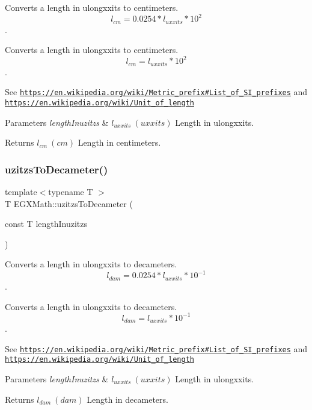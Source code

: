 Converts a length in ulongxxits to centimeters. \[ l_{cm}=0.0254 * l_{uxxits} * 10^{2} \]. 

Converts a length in ulongxxits to centimeters. \[ l_{cm}=l_{uxxits} * 10^{2} \].

See \href{https://en.wikipedia.org/wiki/Metric_prefix#List_of_SI_prefixes}{\tt https\+://en.\+wikipedia.\+org/wiki/\+Metric\+\_\+prefix\#\+List\+\_\+of\+\_\+\+S\+I\+\_\+prefixes} and \href{https://en.wikipedia.org/wiki/Unit_of_length}{\tt https\+://en.\+wikipedia.\+org/wiki/\+Unit\+\_\+of\+\_\+length} 
\begin{DoxyParams}{Parameters}
{\em length\+Inuzitzs} & $ l_{uxxits}\ (uxxits)$ Length in ulongxxits. \\
\hline
\end{DoxyParams}
\begin{DoxyReturn}{Returns}
$ l_{cm}\ (cm)$ Length in centimeters. 
\end{DoxyReturn}
\mbox{\label{group___e_g_x_math-_conversions-_length_conversions-_imperial-uzitzs-_s_i_ga62dcf7a675d92ce74d56e67f2fed7ace}} 
\subsubsection{\texorpdfstring{uzitzs\+To\+Decameter()}{uzitzsToDecameter()}}
{\footnotesize\ttfamily template$<$typename T $>$ \\
T E\+G\+X\+Math\+::uzitzs\+To\+Decameter (\begin{DoxyParamCaption}\item[{const T}]{length\+Inuzitzs }\end{DoxyParamCaption})}



Converts a length in ulongxxits to decameters. \[ l_{dam}=0.0254 * l_{uxxits} * 10^{-1} \]. 

Converts a length in ulongxxits to decameters. \[ l_{dam}=l_{uxxits} * 10^{-1} \].

See \href{https://en.wikipedia.org/wiki/Metric_prefix#List_of_SI_prefixes}{\tt https\+://en.\+wikipedia.\+org/wiki/\+Metric\+\_\+prefix\#\+List\+\_\+of\+\_\+\+S\+I\+\_\+prefixes} and \href{https://en.wikipedia.org/wiki/Unit_of_length}{\tt https\+://en.\+wikipedia.\+org/wiki/\+Unit\+\_\+of\+\_\+length} 
\begin{DoxyParams}{Parameters}
{\em length\+Inuzitzs} & $ l_{uxxits}\ (uxxits)$ Length in ulongxxits. \\
\hline
\end{DoxyParams}
\begin{DoxyReturn}{Returns}
$ l_{dam}\ (dam)$ Length in decameters. 
\end{DoxyReturn}
\mbox{\label{group___e_g_x_math-_conversions-_length_conversions-_imperial-uzitzs-_s_i_ga178324834750df4df1026a8900fadbcc}} 
